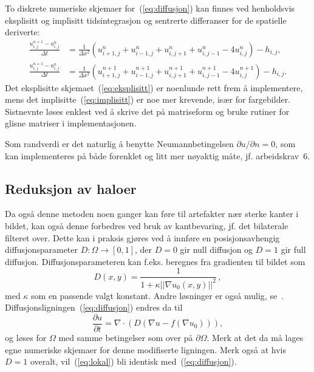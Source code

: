 \documentclass[11pt,a4paper]{article}
\begin{document}
To diskrete numeriske skjemaer for~(\ref{eq:diffusjon}) kan finnes ved henholdsvis eksplisitt og implisitt tidsintegrasjon og sentrerte differanser for de spatielle deriverte:
\begin{align}
  \frac{u^{n+1}_{i,j} - u^n_{i,j}}{\Delta t} &= \frac{1}{\Delta x^2}
                                               (u^n_{i+1,j} +
                                               u^n_{i-1,j} +
                                               u^n_{i,j+1} +
                                               u^n_{i,j-1} -4 
                                               u^n_{i,j}) - h_{i,j},
                                               \label{eq:eksplisitt}  \\
  \frac{u^{n+1}_{i,j} - u^n_{i,j}}{\Delta t} &= \frac{1}{\Delta x^2}
                                               (u^{n+1}_{i+1,j} +
                                               u^{n+1}_{i-1,j} +
                                               u^{n+1}_{i,j+1} +
                                               u^{n+1}_{i,j-1} -4 
                                               u^{n+1}_{i,j}) - h_{i,j}.
                                               \label{eq:implisitt}
\end{align}
Det eksplisitte skjemaet~(\ref{eq:eksplisitt}) er noenlunde rett frem å implementere, mens det implisitte~(\ref{eq:implisitt}) er noe mer krevende, især for fargebilder. Sistnevnte løses enklest ved å skrive det på matriseform og bruke rutiner for glisne matriser i implementasjonen.

Som randverdi er det naturlig å benytte Neumannbetingelsen $\partial u/\partial n = 0$, som kan implementeres på både forenklet og litt mer nøyaktig måte, jf. arbeidskrav~6.

\subsection{Reduksjon av haloer}
\label{sec:anisotrop}

Da også denne metoden noen ganger kan føre til artefakter nær sterke kanter i bildet, kan også denne forbedres ved bruk av kantbevaring, jf. det bilaterale filteret over. Dette kan i praksis gjøres ved å innføre en posisjonsavhengig diffusjonsparameter $D : \Omega \to [0, 1]$, der $D = 0$ gir null diffusjon og $D = 1$ gir full diffusjon. Diffusjonsparameteren kan f.eks. beregnes fra gradienten til bildet som
\begin{equation}
  D(x, y) = \frac{1}{1 + \kappa ||\nabla u_0(x, y)||^2}\,,
\end{equation}
med $\kappa$ som en passende valgt konstant. Andre løsninger er også mulig, se~\cite{Perona:90}. Diffusjonsligningen~(\ref{eq:diffusjon}) endres da til
\begin{equation}
  \label{eq:lokal}
  \frac{\partial u}{\partial t} = \nabla\cdot(D(\nabla u - f(\nabla u_0))),
\end{equation}
og løses for $\Omega$ med samme betingelser som over på $\partial\Omega$. Merk at det da må lages egne numeriske skjemaer for denne modifiserte ligningen. Merk også at hvis $D=1$ overalt, vil~(\ref{eq:lokal}) bli identisk med~(\ref{eq:diffusjon}).
\end{document}
